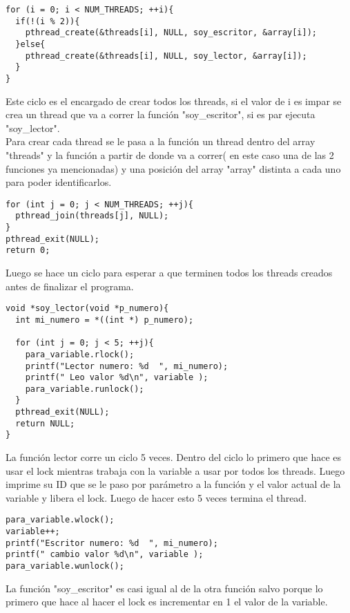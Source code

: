 \begin{verbatim}
for (i = 0; i < NUM_THREADS; ++i){
  if(!(i % 2)){
    pthread_create(&threads[i], NULL, soy_escritor, &array[i]);
  }else{
    pthread_create(&threads[i], NULL, soy_lector, &array[i]);
  }
}
\end{verbatim}

Este ciclo es el encargado de crear todos los threads, si el valor de i es impar se crea un thread que va a correr la funci\'{o}n 
"soy\_escritor", si es par ejecuta "soy\_lector". \\
Para crear cada thread se le pasa a la funci\'{o}n un thread dentro del array "threads" y la funci\'{o}n a partir de donde va 
a correr( en este caso una de las 2 funciones ya mencionadas) y una posici\'{o}n del array "array" distinta a cada uno para 
poder identificarlos.\\

\begin{verbatim}
for (int j = 0; j < NUM_THREADS; ++j){
  pthread_join(threads[j], NULL);
}
pthread_exit(NULL);
return 0;
\end{verbatim}
Luego se hace un ciclo para esperar a que terminen todos los threads creados antes de finalizar el programa.\\

\begin{verbatim}
void *soy_lector(void *p_numero){
  int mi_numero = *((int *) p_numero);

  for (int j = 0; j < 5; ++j){
    para_variable.rlock();
    printf("Lector numero: %d  ", mi_numero);
    printf(" Leo valor %d\n", variable );
    para_variable.runlock();
  }
  pthread_exit(NULL);
  return NULL;
}
\end{verbatim}

La funci\'{o}n lector corre un ciclo 5 veces. Dentro del ciclo lo primero que hace es usar el lock mientras trabaja con la 
variable a usar por todos los threads. Luego imprime su ID que se le paso por par\'{a}metro a la funci\'{o}n y el valor 
actual de la variable y libera el lock. Luego de hacer esto 5 veces termina el thread.\\


\begin{verbatim}
para_variable.wlock();
variable++;
printf("Escritor numero: %d  ", mi_numero);
printf(" cambio valor %d\n", variable );
para_variable.wunlock();
\end{verbatim}

La funci\'{o}n "soy\_escritor" es casi igual al de la otra funci\'{o}n salvo porque lo primero que hace al hacer el lock es 
incrementar en 1 el valor de la variable. \\

